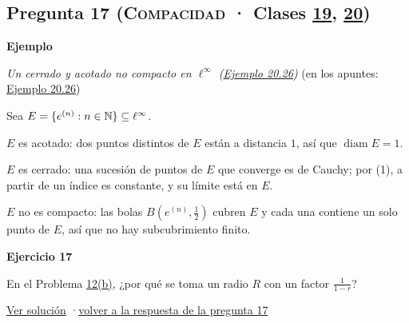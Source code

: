 \documentclass[11pt,a4paper]{article}
\DeclareMathOperator{\diam}{diam}\DeclareMathOperator{\dis}{dis}\DeclareMathOperator{\dist}{dist}
\newcommand{\bloque}[1]{\par\smallskip\noindent\textbf{\color{acento}#1}\par}
\begin{document}
\subsection*{\hypertarget{e-17}{}Pregunta 17 \normalfont\small(\textsc{Compacidad} · Clases \href{https://decostruttivismo.github.io/MAT2514-repaso/pdf/MAT2514_apuntes_completos.pdf\#nameddest=section.19}{19}, \href{https://decostruttivismo.github.io/MAT2514-repaso/pdf/MAT2514_apuntes_completos.pdf\#nameddest=section.20}{20})}
\bloque{Ejemplo}
\textit{Un cerrado y acotado no compacto en $\ell^\infty$ (\href{https://decostruttivismo.github.io/MAT2514-repaso/pdf/MAT2514_apuntes_completos.pdf\#nameddest=teorema.20.26}{Ejemplo 20.26})} {\small(en los apuntes: \href{https://decostruttivismo.github.io/MAT2514-repaso/pdf/MAT2514_apuntes_completos.pdf\#nameddest=teorema.20.26}{Ejemplo 20.26})}
\begin{pasos}
\item[] Sea $E=\{e^{(n)}:n\in\mathbb{N}\}\subseteq\ell^\infty$.
\item[(1)] $E$ es acotado: dos puntos distintos de $E$ están a distancia $1$, así que $\diam E=1$.
\item[(2)] $E$ es cerrado: una sucesión de puntos de $E$ que converge es de Cauchy; por (1), a partir de un índice es constante, y su límite está en $E$.
\item[(3)] $E$ no es compacto: las bolas $B(e^{(n)},\frac12)$ cubren $E$ y cada una contiene un solo punto de $E$, así que no hay subcubrimiento finito.
\end{pasos}
\bloque{\hypertarget{x-17}{}Ejercicio 17}
En el Problema \hyperlink{prob-12}{12(b)}, ¿por qué se toma un radio $R$ con un factor $\frac1{1-r}$?
\par{\small \hyperlink{s-17}{Ver solución} \quad·\quad \hyperlink{r-17}{volver a la respuesta de la pregunta 17}}
\end{document}
